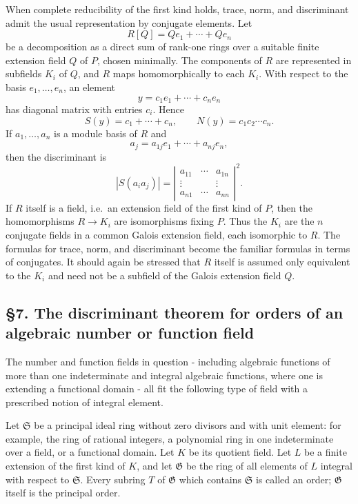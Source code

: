 \documentclass[
  12pt,
]{article}
\begin{document}
When complete reducibility of the first kind holds, trace, norm, and
discriminant admit the usual representation by conjugate elements. Let
\[
  R[Q]=Qe_1+
\cdots+Qe_n
\] be a decomposition as a direct sum of rank-one rings over a suitable
finite extension field \(Q\) of \(P\), chosen minimally. The components
of \(R\) are represented in subfields \(K_i\) of \(Q\), and \(R\) maps
homomorphically to each \(K_i\). With respect to the basis \(e_1,
\ldots,e_n\), an element \[
  y=c_1e_1+
\cdots+c_ne_n
\] has diagonal matrix with entries \(c_i\). Hence \[
  S(y)=c_1+
\cdots+c_n,
  \qquad
  N(y)=c_1c_2\cdots c_n.
\] If \(a_1,
\ldots,a_n\) is a module basis of \(R\) and \[
  a_j=a_{1j}e_1+
\cdots+a_{nj}e_n,
\] then the discriminant is \[
  |S(a_i a_j)|=
  \left|
  \begin{matrix}
  a_{11}&\cdots&a_{1n}\\
  \vdots& &\vdots\\
  a_{n1}&\cdots&a_{nn}
  \end{matrix}
  \right|^2.
\] If \(R\) itself is a field, i.e.~an extension field of the first kind
of \(P\), then the homomorphisms \(R\to K_i\) are isomorphisms fixing
\(P\). Thus the \(K_i\) are the \(n\) conjugate fields in a common
Galois extension field, each isomorphic to \(R\). The formulas for
trace, norm, and discriminant become the familiar formulas in terms of
conjugates. It should again be stressed that \(R\) itself is assumed
only equivalent to the \(K_i\) and need not be a subfield of the Galois
extension field \(Q\).

\subsection{§7. The discriminant theorem for orders of an algebraic
number or function
field}\label{the-discriminant-theorem-for-orders-of-an-algebraic-number-or-function-field}

The number and function fields in question - including algebraic
functions of more than one indeterminate and integral algebraic
functions, where one is extending a functional domain - all fit the
following type of field with a prescribed notion of integral element.

Let \(\mathfrak S\) be a principal ideal ring without zero divisors and
with unit element: for example, the ring of rational integers, a
polynomial ring in one indeterminate over a field, or a functional
domain. Let \(K\) be its quotient field. Let \(L\) be a finite extension
of the first kind of \(K\), and let \(\mathfrak G\) be the ring of all
elements of \(L\) integral with respect to \(\mathfrak S\). Every
subring \(T\) of \(\mathfrak G\) which contains \(\mathfrak S\) is
called an order; \(\mathfrak G\) itself is the principal order.
\end{document}
